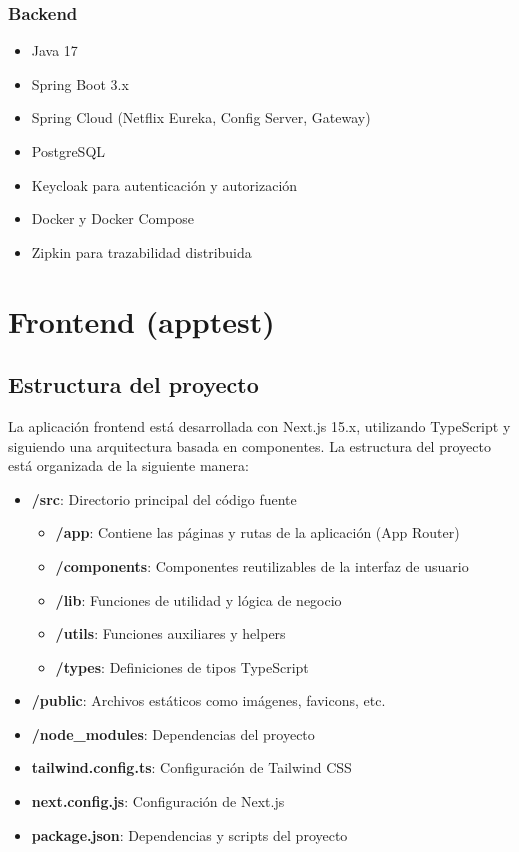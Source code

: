 \documentclass[12pt,a4paper]{report}
\begin{document}
\subsection{Backend}
\begin{itemize}
    \item Java 17
    \item Spring Boot 3.x
    \item Spring Cloud (Netflix Eureka, Config Server, Gateway)
    \item PostgreSQL
    \item Keycloak para autenticación y autorización
    \item Docker y Docker Compose
    \item Zipkin para trazabilidad distribuida
\end{itemize}


\chapter{Frontend (apptest)}
\section{Estructura del proyecto}
La aplicación frontend está desarrollada con Next.js 15.x, utilizando TypeScript y siguiendo una arquitectura basada en componentes. La estructura del proyecto está organizada de la siguiente manera:

\begin{itemize}
    \item \textbf{/src}: Directorio principal del código fuente
    \begin{itemize}
        \item \textbf{/app}: Contiene las páginas y rutas de la aplicación (App Router)
        \item \textbf{/components}: Componentes reutilizables de la interfaz de usuario
        \item \textbf{/lib}: Funciones de utilidad y lógica de negocio
        \item \textbf{/utils}: Funciones auxiliares y helpers
        \item \textbf{/types}: Definiciones de tipos TypeScript
    \end{itemize}
    \item \textbf{/public}: Archivos estáticos como imágenes, favicons, etc.
    \item \textbf{/node\_modules}: Dependencias del proyecto
    \item \textbf{tailwind.config.ts}: Configuración de Tailwind CSS
    \item \textbf{next.config.js}: Configuración de Next.js
    \item \textbf{package.json}: Dependencias y scripts del proyecto
\end{itemize}
\end{document}
